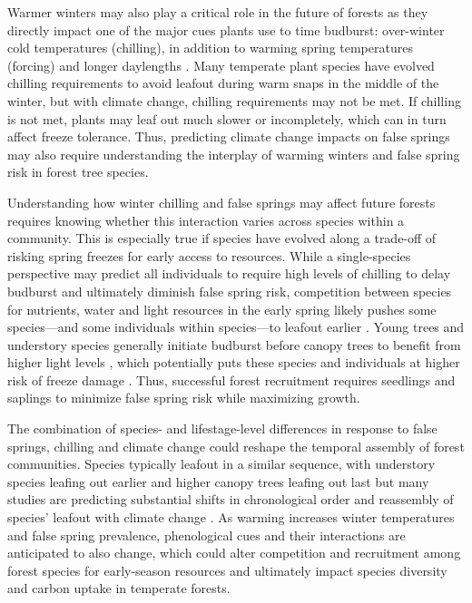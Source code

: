 \documentclass{article}\usepackage[]{graphicx}\usepackage[]{color}
\begin{document}
Warmer winters may also play a critical role in the future of forests as they directly impact one of the  major cues plants use to time budburst: over-winter cold temperatures (chilling), in addition to warming spring temperatures (forcing) and longer daylengths \citep{Chuine2016}. Many temperate plant species have evolved chilling requirements to avoid leafout during warm snaps in the middle of the winter, but with climate change, chilling requirements may not be met. If chilling is not met, plants may leaf out much slower or incompletely, which can in turn affect freeze tolerance. Thus, predicting climate change impacts on false springs may also require understanding the interplay of warming winters and false spring risk in forest tree species. 
  
Understanding how winter chilling and false springs may affect future forests requires knowing whether this interaction varies across species within a community. This is especially true if species have evolved along a trade-off of risking spring freezes for early access to resources. While a single-species perspective may predict all individuals to require high levels of chilling to delay budburst and ultimately diminish false spring risk, competition between species for nutrients, water and light resources in the early spring likely pushes some species---and some individuals within species---to leafout earlier \citep{Augspurger2013}. Young trees and understory species generally initiate budburst before canopy trees to benefit from higher light levels \citep {Augspurger2008, Vitasse2013}, which potentially puts these species and individuals at higher risk of freeze damage \citep{Vitasse2014}. Thus, successful forest recruitment requires seedlings and saplings to minimize false spring risk while maximizing growth. 
 
The combination of species- and lifestage-level differences in response to false springs, chilling and climate change could reshape the temporal assembly of forest communities. Species typically leafout in a similar sequence, with understory species leafing out earlier and higher canopy trees leafing out last but many studies are predicting substantial shifts in chronological order and reassembly of species' leafout with climate change \citep{Roberts2015, Laube2014}. As warming increases winter temperatures and false spring prevalence, phenological cues and their interactions are anticipated to also change, which could alter competition and recruitment among forest species for early-season resources and ultimately impact species diversity and carbon uptake in temperate forests.
  
\end{document}
